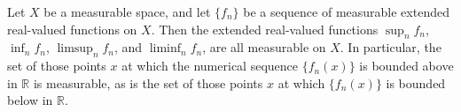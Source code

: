 Let $X$ be a measurable space, and let $\{f_n\}$ be a sequence of measurable extended real-valued functions on $X$. Then the extended real-valued functions $\sup_n f_n$, $\inf_n f_n$, $\limsup_n f_n$, and $\liminf_n f_n$, are all measurable on $X$. In particular, the set of those points $x$ at which the numerical sequence $\{f_n(x)\}$ is bounded above in $\mathbb{R}$ is measurable, as is the set of those points $x$ at which $\{f_n(x)\}$ is bounded below in $\mathbb{R}$.
